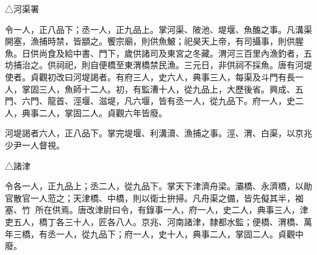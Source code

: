 \begin{pinyinscope}
 △河渠署



 令一人，正八品下；丞一人，正九品上。掌河渠、陂池、堤堰、魚醢之事。凡溝渠開塞，漁捕時禁，皆顓之。饗宗廟，則供魚鮍；祀昊天上帝，有司攝事，則供腥魚。日供尚食及給中書、門下，歲供諸司及東宮之冬藏。渭河三百里內漁釣者，五坊捕治之。供祠祀，則自便橋至東渭橋禁民漁。三元日，非供祠不採魚。唐有河堤使者。貞觀初改曰河堤謁者。有府三人，史六人，典事三人，每渠及斗門有長一人，掌固三人，魚師十二人。初，有監漕十人，從九品上，大歷後省。興成、五門、六門、龍首、涇堰、滋堤，凡六堰，皆有丞一人，從九品下。府一人，史二人，典事二人，掌固二人。貞觀六年皆廢。



 河堤謁者六人，正八品下。掌完堤堰、利溝瀆、漁捕之事。涇、渭、白渠，以京兆少尹一人督視。



 △諸津



 令各一人，正九品上；丞二人，從九品下。掌天下津濟舟梁。灞橋、永濟橋，以勛官散官一人蒞之；天津橋、中橋，則以衛士拚掃。凡舟渠之備，皆先儗其半，袽塞、竹，所在供焉。唐改津尉曰令，有錄事一人，府一人，史二人，典事三人，津吏五人，橋丁各三十人，匠各八人。京兆、河南諸津，隸都水監；便橋、渭橋、萬年三橋，有丞一人，從九品下；府一人，史十人，典事二人，掌固二人。貞觀中廢。



\end{pinyinscope}